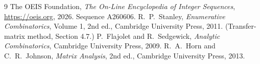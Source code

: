 \documentclass[11pt,a4paper]{article}
\theoremstyle{plain}
\theoremstyle{definition}
\begin{document}
\begin{thebibliography}{9}
 The OEIS Foundation, \emph{The On-Line Encyclopedia of Integer
Sequences}, \url{https://oeis.org}, 2026. Sequence A260606.
 R.~P.~Stanley, \emph{Enumerative Combinatorics}, Volume 1, 2nd ed.,
Cambridge University Press, 2011. (Transfer-matrix method, Section 4.7.)
 P.~Flajolet and R.~Sedgewick, \emph{Analytic Combinatorics}, Cambridge
University Press, 2009.
 R.~A.~Horn and C.~R.~Johnson, \emph{Matrix Analysis}, 2nd ed., Cambridge
University Press, 2013.
\end{thebibliography}
\end{document}
